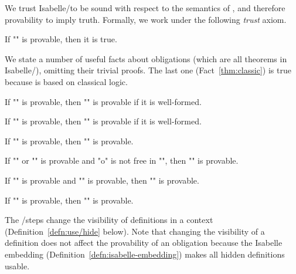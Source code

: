 \documentclass[a4paper]{easychair}
\begin{document}
\noindent We trust Isabelle/\tlaplus to be sound with respect to the semantics
of \tlatwo, and therefore provability to imply truth. Formally, we
work under the following \textit{trust} axiom.

\begin{axm}[Trust] \label{axm:trust} \mbox{}
If "\phi" is provable, then it is true.
\end{axm}

\noindent We state a number of useful facts about
obligations (which are all theorems in Isabelle/\tlaplus),
omitting their trivial proofs. The last one
(Fact~\ref{thm:classic}) is true because \tlaplus is based on
classical logic.

\begin{fac}[Definition] \label{thm:definition}
If "" is provable, then "" is provable if it is well-formed.
\end{fac}

\begin{fac}[Weakening] \label{thm:weaken}
If "" is provable, then "" is
  provable if it is well-formed.
\end{fac}

\begin{fac}[Expansion] \label{thm:expand}
If "" is provable, then "" is provable.
\end{fac}

\begin{fac}[Strengthening] \label{thm:delete}
If "" or "" is provable and "o" is not free in "", then
  "" is provable.
\end{fac}

\begin{fac}[Cut] \label{thm:cut}
If "" is provable and "" is provable,
  then "" is provable.
\end{fac}

\begin{fac} \label{thm:classic}
If "" is provable, then ""
  is provable.
\end{fac}

\noindent The \USE/\HIDE \DEFS steps change the visibility of definitions in a
context (Definition~\ref{defn:use/hide} below). Note that changing the
visibility of a definition does not affect the provability of an obligation
because the Isabelle embedding (Definition~\ref{defn:isabelle-embedding})
makes all hidden definitions usable.
\end{document}
